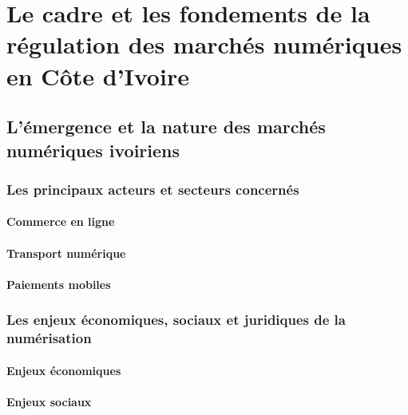 
\part{Le cadre et les fondements de la régulation des marchés numériques en Côte d’Ivoire}

\newpage
\chapter{L’émergence et la nature des marchés numériques ivoiriens}

\section{Les principaux acteurs et secteurs concernés}

\subsection{Commerce en ligne}


\subsection{Transport numérique}


\subsection{Paiements mobiles}


\section{Les enjeux économiques, sociaux et juridiques de la numérisation}

\subsection{Enjeux économiques}


\subsection{Enjeux sociaux}

